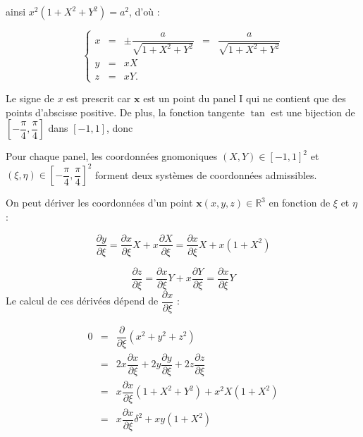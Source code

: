 ainsi $x^2 \left( 1+X^2+Y^2 \right) = a^2$, d'où :

\begin{equation}
\left\lbrace
\begin{array}{rclcl}
x & = & \pm \dfrac{a}{\sqrt{1+X^2+Y^2}}& = & \dfrac{a}{\sqrt{1+X^2+Y^2}}\\
y & = & xX &&\\
z & = & xY. &&
\end{array}
\right.
\end{equation}

Le signe de $x$ est prescrit car $\mathbf{x}$ est un point du panel I qui ne contient que des points d'abscisse positive.
De plus, la fonction tangente $\tan$ est une bijection de $\left[ -\dfrac{\pi}{4}, \dfrac{\pi}{4} \right]$ dans $\left[-1,1\right]$, donc

\begin{theoreme}
Pour chaque panel, les coordonnées gnomoniques $(X,Y) \in [-1,1]^2$ et $(\xi, \eta) \in \left[ - \dfrac{\pi}{4}, \dfrac{\pi}{4} \right]^2$ forment deux systèmes de coordonnées admissibles.
\end{theoreme}

On peut dériver les coordonnées d'un point $\mathbf{x}(x,y,z) \in \mathbb{R}^3$ en fonction de $\xi$ et $\eta$ :

\begin{equation}
\dfrac{\partial y}{\partial \xi} = \dfrac{\partial x}{\partial \xi} X + x \dfrac{\partial X}{\partial \xi} = \dfrac{\partial x}{\partial \xi} X + x(1+X^2)
\end{equation}

\begin{equation}
\dfrac{\partial z}{\partial \xi} = \dfrac{\partial x}{\partial \xi} Y + x \dfrac{\partial Y}{\partial \xi} = \dfrac{\partial x}{\partial \xi} Y
\end{equation}
Le calcul de ces dérivées dépend de $\dfrac{\partial x}{\partial \xi}$ :

\begin{equation*}
\begin{array}{rcl}
0 & = & \dfrac{\partial}{\partial \xi} ( x^2+y^2+z^2) \\
  & = & 2x\dfrac{\partial x}{\partial \xi} + 2y\dfrac{\partial y}{\partial \xi}+ 2z\dfrac{\partial z}{\partial \xi} \\
  & = & x \dfrac{\partial x}{\partial \xi} ( 1 +X^2 + Y^2) + x^2 X (1+X^2)\\
  & = & x \dfrac{\partial x}{\partial \xi} \delta^2 + xy (1+X^2)
\end{array}
\end{equation*}


